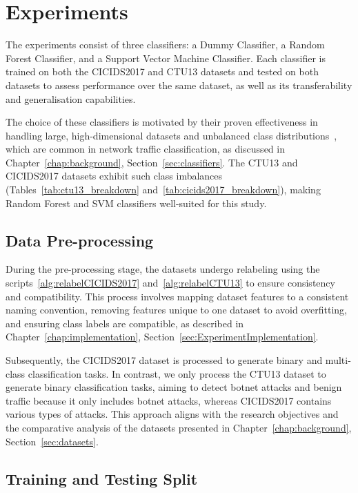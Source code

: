 \section{Experiments}\label{sec:Experiments}

The experiments consist of three classifiers: a Dummy Classifier, a Random Forest Classifier, and a Support Vector Machine Classifier. Each classifier is trained on both the CICIDS2017 and CTU13 datasets and tested on both datasets to assess performance over the same dataset, as well as its transferability and generalisation capabilities.

The choice of these classifiers is motivated by their proven effectiveness in handling large, high-dimensional datasets and unbalanced class distributions~\cite{farnaaz2016random, teng2017svm}, which are common in network traffic classification, as discussed in Chapter~\ref{chap:background}, Section~\ref{sec:classifiers}. The CTU13 and CICIDS2017 datasets exhibit such class imbalances (Tables~\ref{tab:ctu13_breakdown} and~\ref{tab:cicids2017_breakdown}), making Random Forest and SVM classifiers well-suited for this study.

\subsection{Data Pre-processing}\label{subsec:DataPreprocessing}

During the pre-processing stage, the datasets undergo relabeling using the scripts~\ref{alg:relabelCICIDS2017} and~\ref{alg:relabelCTU13} to ensure consistency and compatibility. This process involves mapping dataset features to a consistent naming convention, removing features unique to one dataset to avoid overfitting, and ensuring class labels are compatible, as described in Chapter~\ref{chap:implementation}, Section~\ref{sec:ExperimentImplementation}.

Subsequently, the CICIDS2017 dataset is processed to generate binary and multi-class classification tasks. In contrast, we only process the CTU13 dataset to generate binary classification tasks, aiming to detect botnet attacks and benign traffic because it only includes botnet attacks, whereas CICIDS2017 contains various types of attacks. This approach aligns with the research objectives and the comparative analysis of the datasets presented in Chapter~\ref{chap:background}, Section~\ref{sec:datasets}.

\subsection{Training and Testing Split}\label{subsec:TrainingTestingSplit}


